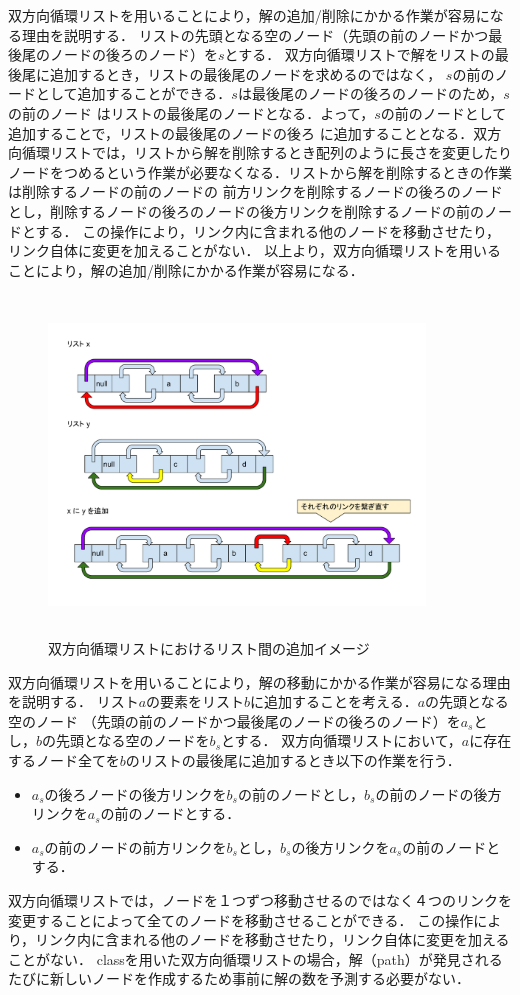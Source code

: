 \documentclass[12pt]{optlab-bachelor}
\begin{document}
双方向循環リストを用いることにより，解の追加/削除にかかる作業が容易になる理由を説明する．
リストの先頭となる空のノード（先頭の前のノードかつ最後尾のノードの後ろのノード）を$s$とする．
双方向循環リストで解をリストの最後尾に追加するとき，リストの最後尾のノードを求めるのではなく，
$s$の前のノードとして追加することができる．$s$は最後尾のノードの後ろのノードのため，$s$の前のノード
はリストの最後尾のノードとなる．よって，$s$の前のノードとして追加することで，リストの最後尾のノードの後ろ
に追加することとなる．双方向循環リストでは，リストから解を削除するとき配列のように長さを変更したり
ノードをつめるという作業が必要なくなる．リストから解を削除するときの作業は削除するノードの前のノードの
前方リンクを削除するノードの後ろのノードとし，削除するノードの後ろのノードの後方リンクを削除するノードの前のノードとする．
この操作により，リンク内に含まれる他のノードを移動させたり，リンク自体に変更を加えることがない．
以上より，双方向循環リストを用いることにより，解の追加/削除にかかる作業が容易になる．

\begin{figure}[htbp]
  \centering
  \caption{双方向循環リストにおけるリスト間の追加イメージ}
  \includegraphics[height=9.0cm, width=10.0cm]{fig/fig12.pdf}
\end{figure}

双方向循環リストを用いることにより，解の移動にかかる作業が容易になる理由を説明する．
リスト$a$の要素をリスト$b$に追加することを考える．$a$の先頭となる空のノード
（先頭の前のノードかつ最後尾のノードの後ろのノード）を$a_s$とし，$b$の先頭となる空のノードを$b_s$とする．
双方向循環リストにおいて，$a$に存在するノード全てを$b$のリストの最後尾に追加するとき以下の作業を行う．
\begin{itemize}
  \item $a_s$の後ろノードの後方リンクを$b_s$の前のノードとし，$b_s$の前のノードの後方リンクを$a_s$の前のノードとする．
  \item $a_s$の前のノードの前方リンクを$b_s$とし，$b_s$の後方リンクを$a_s$の前のノードとする．
\end{itemize}
双方向循環リストでは，ノードを１つずつ移動させるのではなく４つのリンクを変更することによって全てのノードを移動させることができる．
この操作により，リンク内に含まれる他のノードを移動させたり，リンク自体に変更を加えることがない．
classを用いた双方向循環リストの場合，解（path）が発見されるたびに新しいノードを作成するため事前に解の数を予測する必要がない．
\end{document}
